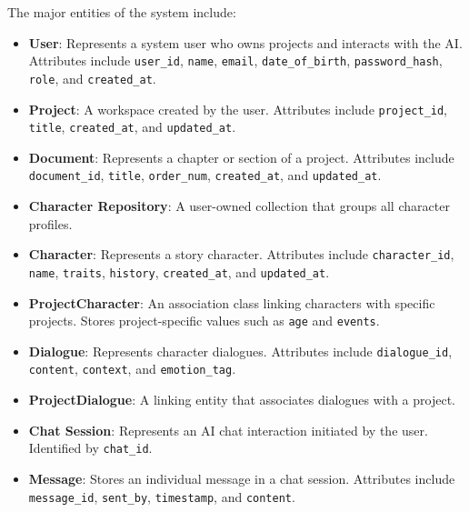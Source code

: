 The major entities of the system include:

\begin{itemize}
    \item \textbf{User}: Represents a system user who owns projects and interacts with the AI. Attributes include \texttt{user\_id}, \texttt{name}, \texttt{email}, \texttt{date\_of\_birth}, \texttt{password\_hash}, \texttt{role}, and \texttt{created\_at}.
    
    \item \textbf{Project}: A workspace created by the user. Attributes include \texttt{project\_id}, \texttt{title}, \texttt{created\_at}, and \texttt{updated\_at}.
    
    \item \textbf{Document}: Represents a chapter or section of a project. Attributes include \texttt{document\_id}, \texttt{title}, \texttt{order\_num}, \texttt{created\_at}, and \texttt{updated\_at}.
    
    \item \textbf{Character Repository}: A user-owned collection that groups all character profiles.
    
    \item \textbf{Character}: Represents a story character. Attributes include \texttt{character\_id}, \texttt{name}, \texttt{traits}, \texttt{history}, \texttt{created\_at}, and \texttt{updated\_at}.
    
    \item \textbf{ProjectCharacter}: An association class linking characters with specific projects. Stores project-specific values such as \texttt{age} and \texttt{events}.
    
    \item \textbf{Dialogue}: Represents character dialogues. Attributes include \texttt{dialogue\_id}, \texttt{content}, \texttt{context}, and \texttt{emotion\_tag}.
    
    \item \textbf{ProjectDialogue}: A linking entity that associates dialogues with a project.
    
    \item \textbf{Chat Session}: Represents an AI chat interaction initiated by the user. Identified by \texttt{chat\_id}.
    
    \item \textbf{Message}: Stores an individual message in a chat session. Attributes include \texttt{message\_id}, \texttt{sent\_by}, \texttt{timestamp}, and \texttt{content}.
    

\end{itemize}
